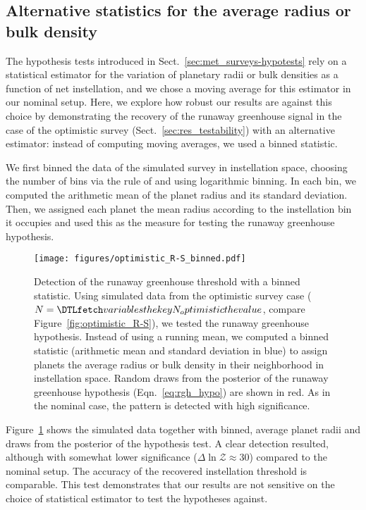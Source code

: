 \documentclass[twocolumn,twocolappendix]{aastex631}
\begin{document}
\subsection{Alternative statistics for the average radius or bulk density}\label{app:binnedstats}
The hypothesis tests introduced in Sect.~\ref{sec:met_surveys-hypotests} rely on a statistical estimator for the variation of planetary radii or bulk densities as a function of net instellation, and we chose a moving average for this estimator in our nominal setup.
Here, we explore how robust our results are against this choice by demonstrating the recovery of the runaway greenhouse signal in the case of the optimistic survey (Sect.~\ref{sec:res_testability}) with an alternative estimator: instead of computing moving averages, we used a binned statistic.

We first binned the data of the simulated survey in instellation space, choosing the number of bins via the rule of \citet{Freedman1981} and using logarithmic binning.
In each bin, we computed the arithmetic mean of the planet radius and its standard deviation.
Then, we assigned each planet the mean radius according to the instellation bin it occupies and used this as the measure for testing the runaway greenhouse hypothesis.

\begin{figure}[ht!]
    \begin{centering}
        \texttt{[image: figures/optimistic\_R-S\_binned.pdf]}
        \caption{
            Detection of the runaway greenhouse threshold with a binned statistic.
            Using simulated data from the optimistic survey case ($N = \var{N_optimistic}$, compare Figure~\ref{fig:optimistic_R-S}), we tested the runaway greenhouse hypothesis. Instead of using a running mean, we computed a binned statistic (arithmetic mean and standard deviation in blue) to assign planets the average radius or bulk density in their neighborhood in instellation space. Random draws from the posterior of the runaway greenhouse hypothesis (Eqn.~\ref{eq:rgh_hypo}) are shown in red.
            As in the nominal case, the pattern is detected with high significance.
        }
        \label{fig:optimistic_R-S_binned}
    \end{centering}
\end{figure}
Figure~\ref{fig:optimistic_R-S_binned} shows the simulated data together with binned, average planet radii and draws from the posterior of the hypothesis test.
A clear detection resulted, although with somewhat lower significance ($\Delta \ln \mathcal{Z} \approx 30$) compared to the nominal setup.
The accuracy of the recovered instellation threshold is comparable.
This test demonstrates that our results are not sensitive on the choice of statistical estimator to test the hypotheses against.
\end{document}
